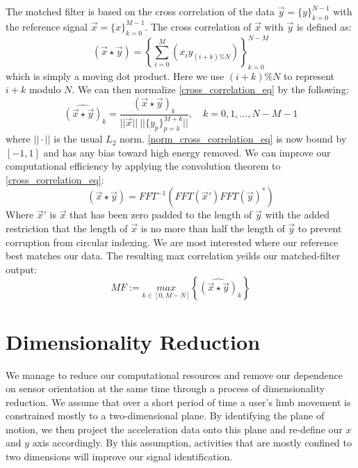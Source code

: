 \documentclass[journal]{IEEEtran}
\begin{document}
The matched filter is based on the cross correlation of the data $\vec{y} = \{y\}_{k=0}^{N-1}$ with the reference signal $\vec{x} = \{x\}_{k=0}^{M-1}$.
The cross correlation of $\vec{x}$ with $\vec{y}$ is defined as:
%
\begin{equation} \label{cross_correlation_eq}
(\vec{x} \star \vec{y}) = \left \{\sum_{i=0}^{M}(x_{i} y_{(i+k)\%N}) \right \}_{k=0}^{N-M}
\end{equation}
%
which is simply a moving dot product. Here we use $(i+k)\%N$ to represent $i+k$ modulo $N$.
We can then normalize \eqref{cross_correlation_eq} by the following:
%
\begin{equation} \label{norm_cross_correlation_eq}
\widehat{(\vec{x} \star \vec{y})}_k = \frac{(\vec{x} \star \vec{y})_k}{||\vec{x}|| \ || \{y_p\}_{p=k}^{M+k} || }, \quad k = 0,1,...,N-M-1
\end{equation}
%
where $|| \cdot ||$ is the usual $L_2$ norm. \eqref{norm_cross_correlation_eq} is now bound by $[-1,1]$ and has any bias toward high energy removed.
We can improve our computational efficiency by applying the convolution theorem to \eqref{cross_correlation_eq}:
%
\begin{equation} \label{conv_theorem}
(\vec{x} \star \vec{y}) = FFT^{-1}(FFT(\vec{x}') FFT(\vec{y})^*)
\end{equation}
%
Where $\vec{x}'$ is $\vec{x}$ that has been zero padded to the length of $\vec{y}$ with the added restriction that the length of $\vec{x}$ is no more than half the length of $\vec{y}$ to prevent corruption from circular indexing.
We are most interested where our reference best matches our data.
The resulting max correlation yeilds our matched-filter output:
%
\begin{equation} \label{matched_filter_eq}
MF := \underset{k \in [0, M-N]}{max} \left \{\widehat{(\vec{x} \star \vec{y})}_k \right \}
\end{equation}
%
\section{Dimensionality Reduction}
We manage to reduce our computational resources and remove our dependence on sensor orientation at the same time through a process of dimensionality reduction.
We assume that over a short period of time a user’s limb movement is constrained mostly to a two-dimensional plane.
By identifying the plane of motion, we then project the acceleration data onto this plane and re-define our $x$ and $y$ axis accordingly.
By this assumption, activities that are mostly confined to two dimensions will improve our signal identification.
\end{document}
